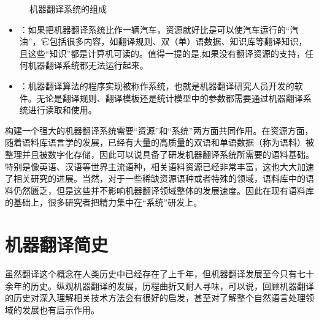 \begin{figure}[htp]
    \centering

    \caption{机器翻译系统的组成}
    \label{fig:1-2}
\end{figure}

\begin{itemize}
\vspace{0.5em}
\item {\small{}}：如果把机器翻译系统比作一辆汽车，资源就好比是可以使汽车运行的“汽油”，它包括很多内容，如翻译规则、双（单）语数据、知识库等翻译知识，且这些“知识”都是计算机可读的。值得一提的是,如果没有翻译资源的支持，任何机器翻译系统都无法运行起来。
\vspace{0.5em}
\item {\small{}}：机器翻译算法的程序实现被称作系统，也就是机器翻译研究人员开发的软件。无论是翻译规则、翻译模板还是统计模型中的参数都需要通过机器翻译系统进行读取和使用。
\vspace{0.5em}
\end{itemize}

\parinterval 构建一个强大的机器翻译系统需要“资源”和“系统”两方面共同作用。在资源方面，随着语料库语言学的发展，已经有大量的高质量的双语和单语数据（称为语料）被整理并且被数字化存储，因此可以说具备了研发机器翻译系统所需要的语料基础。特别是像英语、汉语等世界主流语种，相关语料资源已经非常丰富，这也大大加速了相关研究的进展。当然，对于一些稀缺资源语种或者特殊的领域，语料库中的语料仍然匮乏，但是这些并不影响机器翻译领域整体的发展速度。因此在现有语料库的基础上，很多研究者把精力集中在“系统”研发上。


\sectionnewpage
\section{机器翻译简史}

\parinterval 虽然翻译这个概念在人类历史中已经存在了上千年，但机器翻译发展至今只有七十余年的历史。纵观机器翻译的发展，历程曲折又耐人寻味，可以说，回顾机器翻译的历史对深入理解相关技术方法会有很好的启发，甚至对了解整个自然语言处理领域的发展也有启示作用。


